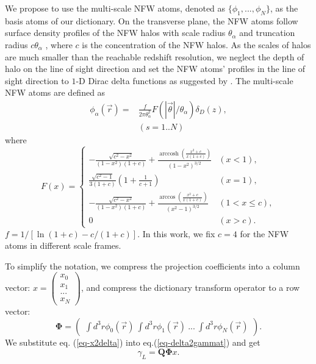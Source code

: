 \documentclass[twocolumn]{aastex62}
\DeclareMathOperator{\arccosh}{arccosh}
\begin{document}
We propose to use the multi-scale NFW atoms, denoted as
$\{\phi_1,...,\phi_N\}$, as the basis atoms of our dictionary.  On the
transverse plane, the NFW atoms follow surface density profiles of the NFW
halos \citep{haloModel-TJ2003-3pt} with scale radius $\theta_\alpha$ and
truncation radius $c \theta_\alpha$ , where $c$ is the concentration of the NFW
halos.  As the scales of halos are much smaller than the reachable redshift
resolution, we neglect the depth of halo on the line of sight direction and set
the NFW atoms' profiles in the line of sight direction to $1$-D Dirac delta
functions as suggested by \citep{LSS-massMap-Glimpse3D-Leonard2014}. The
multi-scale NFW atoms are defined as
\begin{equation}
\begin{split}
\phi_\alpha(\vec{r}) =&\frac{f }{2 \pi \theta_\alpha^2 }
F(|\vec{\theta}|/\theta_\alpha) \delta_D(z),\\
&  (s=1..N)
\end{split}
\end{equation}
where
\begin{equation}
F(x)=
\begin{cases}
-\frac{\sqrt{c^2-x^2}}{(1-x^2)(1+c)} + \frac{\arccosh
\left(\frac{x^2+c}{x(1+c)}\right)}{(1-x^2)^{3/2}}  & (x<1),\\
\frac{\sqrt{c^2-1}}{3(1+c)} (1+\frac{1}{c+1}) & (x=1),\\
-\frac{\sqrt{c^2-x^2}}{(1-x^2)(1+c)} +
\frac{\arccos\left(\frac{x^2+c}{x(1+c)}\right)}{(x^2-1)^{3/2}} & (1<x\leq c),\\
0& (x>c).
\end{cases}
\end{equation}
$f=1/[\ln (1+c)-c/(1+c)]$. In this work, we fix $c=4$ for the NFW atoms in
different scale frames.

To simplify the notation, we compress the projection coefficients into a column
vector:
$x=\begin{pmatrix}
x_{0}\\
x_{1}\\
...\\
x_{N}
\end{pmatrix}$,
and compress the dictionary transform operator to a row vector:
\begin{equation}
\mathbf{\Phi}=\begin{pmatrix}
\int d^3r\phi_0(\vec{r}) ~\int d^3r \phi_1(\vec{r})~ ...~\int d^3r \phi_{N}(\vec{r})
\end{pmatrix}.
\end{equation}
We substitute eq. (\ref{eq-x2delta}) into eq.(\ref{eq-delta2gammat}) and get
\begin{equation}\label{eq-x2gammat}
\gamma_L=\mathbf{Q}\mathbf{\Phi} x.
\end{equation}
\end{document}
